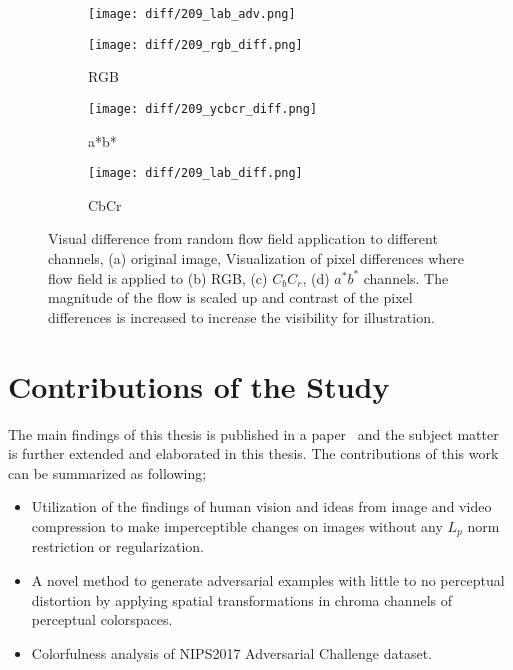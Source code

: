 \begin{figure}[t]
    \centering
    \begin{subfigure}[b]{.4\linewidth}
        \texttt{[image: diff/209\_lab\_adv.png]}
        \caption{}
    \end{subfigure}
    \begin{subfigure}[b]{.4\linewidth}
        \texttt{[image: diff/209\_rgb\_diff.png]}
        \caption{RGB}
    \end{subfigure}
    \begin{subfigure}[b]{.4\linewidth}
        \texttt{[image: diff/209\_ycbcr\_diff.png]}
        \caption{a*b*}
    \end{subfigure}
    \begin{subfigure}[b]{.4\linewidth}
        \texttt{[image: diff/209\_lab\_diff.png]}
        \caption{CbCr}
    \end{subfigure}
    \caption[Visual difference from random flow field application to different channels.]{ Visual difference from random flow field application to different channels, (a) original image, Visualization of pixel differences where flow field is applied to (b) RGB, (c) \(C_{b}C_{r}\), (d) \(a^*b^*\) channels. The magnitude of the flow is scaled up and contrast of the pixel differences is increased to increase the visibility for illustration. }\label{fig:diff}
\end{figure}


\section{Contributions of the Study}

The main findings of this thesis is published in a paper~\cite{aydin2019imperceptible} and the subject matter is further extended and elaborated in this thesis. The contributions of this work can be summarized as following;
\begin{itemize}
    \item Utilization of the findings of human vision and ideas from image and video compression to make imperceptible changes on images without any \(L_p\) norm restriction or regularization.
    \item A novel method to generate adversarial examples with little to no perceptual distortion by applying spatial transformations in chroma channels of perceptual colorspaces.
    \item Colorfulness analysis of NIPS2017 Adversarial Challenge dataset.
\end{itemize}

